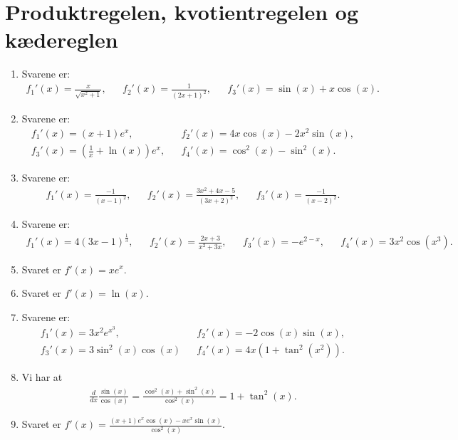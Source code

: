 \section{Produktregelen, kvotientregelen og kædereglen}
\begin{enumerate}

	\item Svarene er:
	\begin{align*}
	f_1'(x)=\frac{x}{\sqrt{x^2+1}},&& f_2'(x)=\frac{1}{(2x+1)^2},&& f_3'(x)=\sin(x)+x\cos(x).
	\end{align*}

	\item Svarene er:
	\begin{align*}
	f_1'(x)=(x+1)e^x,&& f_2'(x)=4x\cos(x)-2x^2\sin(x),\\ f_3'(x)=(\frac{1}{x}+\ln(x))e^x,&& f_4'(x)=\cos^2(x)-\sin^2(x).
	\end{align*}

	\item Svarene er:
	\begin{align*}
	f_1'(x)=\frac{-1}{(x-1)^2},&&f_2'(x)=\frac{3x^2+4x-5}{(3x+2)^2},&&f_3'(x)=\frac{-1}{(x-2)^2}.
	\end{align*}
	
	\item Svarene er:
	\begin{align*}
	f_1'(x)=4(3x-1)^\frac{1}{3},&& f_2'(x)=\frac{2x+3}{x^2+3x},&& f_3'(x)=-e^{2-x},&&f_4'(x)=3x^2\cos(x^3).
	\end{align*}
	
	\item \label{it:diff24ans} Svaret er $f'(x)=xe^x$.
	
	
	\item \label{it:diff23ans} Svaret er $f'(x)=\ln(x)$.
	
	\item Svarene er:
	\begin{align*}
	f_1'(x)=3x^2e^{x^3},&&f_2'(x)=-2\cos(x)\sin(x),\\f_3'(x)=3\sin^2(x)\cos(x)&&f_4'(x)=4x(1+\tan^2(x^2)).
	\end{align*}
		
	\item\label{it:diff21ans} Vi har at 
	\begin{align*}
	\frac{d}{dx} \frac{\sin(x)}{\cos(x)}=\frac{\cos^2(x)+\sin^2(x)}{\cos^2(x)}=1+\tan^2(x).
	\end{align*}

	\item Svaret er $f'(x)=\frac{(x+1)e^x\cos(x)-xe^x\sin(x)}{\cos^2(x)}$.
		

\end{enumerate}
